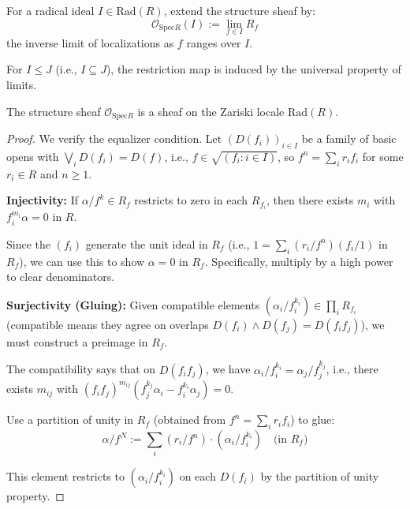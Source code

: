 \begin{definition}
  \label{def:structure-sheaf-radical-ideals}
  \leanok
  For a radical ideal $I \in \mathrm{Rad}(R)$, extend the structure sheaf by:
  $$\mathcal{O}_{\mathrm{Spec} R}(I) := \lim_{f \in I} R_f$$
  the inverse limit of localizations as $f$ ranges over $I$.
  
  For $I \leq J$ (i.e., $I \subseteq J$), the restriction map is induced by the universal property of limits.
\end{definition}

\begin{theorem}
  \label{thm:structure-sheaf-property}
  The structure sheaf $\mathcal{O}_{\mathrm{Spec} R}$ is a sheaf on the Zariski locale $\mathrm{Rad}(R)$.
\end{theorem}

\begin{proof}
  We verify the equalizer condition. Let $(D(f_i))_{i \in I}$ be a family of basic opens with $\bigvee_i D(f_i) = D(f)$, 
  i.e., $f \in \sqrt{(f_i : i \in I)}$, so $f^n = \sum_i r_i f_i$ for some $r_i \in R$ and $n \geq 1$.
  
  \textbf{Injectivity:} If $\alpha/f^k \in R_f$ restricts to zero in each $R_{f_i}$, then there exists $m_i$ with 
  $f_i^{m_i} \alpha = 0$ in $R$.
  
  Since the $(f_i)$ generate the unit ideal in $R_f$ (i.e., $1 = \sum_i (r_i/f^n)(f_i/1)$ in $R_f$), 
  we can use this to show $\alpha = 0$ in $R_f$. Specifically, multiply by a high power to clear denominators.
  
  \textbf{Surjectivity (Gluing):} Given compatible elements $(\alpha_i/f_i^{k_i}) \in \prod_i R_{f_i}$ 
  (compatible means they agree on overlaps $D(f_i) \land D(f_j) = D(f_i f_j)$), we must construct a preimage in $R_f$.
  
  The compatibility says that on $D(f_i f_j)$, we have $\alpha_i/f_i^{k_i} = \alpha_j/f_j^{k_j}$, 
  i.e., there exists $m_{ij}$ with $(f_i f_j)^{m_{ij}} (f_j^{k_j} \alpha_i - f_i^{k_i} \alpha_j) = 0$.
  
  Use a partition of unity in $R_f$ (obtained from $f^n = \sum_i r_i f_i$) to glue:
  $$\alpha/f^N := \sum_i (r_i/f^n) \cdot (\alpha_i/f_i^{k_i}) \quad \text{(in } R_f\text{)}$$
  
  This element restricts to $(\alpha_i/f_i^{k_i})$ on each $D(f_i)$ by the partition of unity property.
\end{proof}



